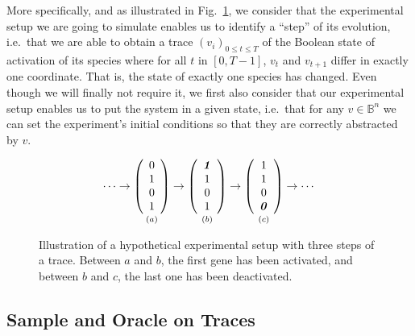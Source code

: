 \documentclass{llncs}
\begin{document}
More specifically, and as illustrated in Fig.~\ref{steps}, we consider that the experimental setup we are going to simulate enables us to identify a ``step'' of its evolution, i.e.~that we are able to obtain a trace $(v_i)_{0 \leq t \leq T}$ of the Boolean state of activation of its species where for all $t$ in $[0,T-1]$, $v_t$ and $v_{t+1}$ differ in exactly one coordinate. That is, the state of exactly one species has changed.
Even though we will finally not require it, we first also consider that our experimental setup enables us to put the system in a given state, i.e.~that for any $v \in \mathbb{B}^n$ we can set the experiment's initial conditions so that they are correctly abstracted by $v$.


\begin{figure}[htbp]
	{\large 
	\[
	\cdots
	\rightarrow
	\underset{\vspace{1em}(a)}{
		\left(\begin{array}{c}
		0\\ 1\\ 0\\ 1
		\end{array}\right)}
	\rightarrow
	\underset{\vspace{1em}(b)}{
		\left(\begin{array}{c}
		\textbf{\textit{1}}\\ 1\\ 0\\ 1
		\end{array}\right)}
	\rightarrow
	\underset{\vspace{1em}(c)}{
		\left(\begin{array}{c}
		1\\ 1\\ 0\\ \textbf{\textit 0}
		\end{array}\right)}
	\rightarrow
	\cdots
	\]
}
	\caption{\label{steps}Illustration of a hypothetical experimental setup with three steps of a trace. Between $a$ and $b$, the first gene has been activated, and between $b$ and $c$, the last one has been deactivated.}
\end{figure}



\subsection{Sample and Oracle on  Traces}
\end{document}
